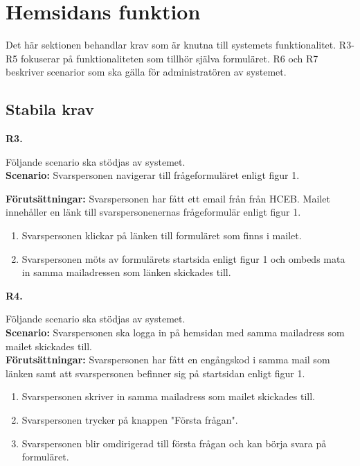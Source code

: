 \documentclass{article}
\begin{document}
    \section{Hemsidans funktion}
\normalsize{Det här sektionen behandlar krav som är knutna till systemets funktionalitet. R3-R5 fokuserar på funktionaliteten som tillhör själva formuläret. R6 och R7 beskriver scenarior som ska gälla för administratören av systemet.
}
    \subsection{Stabila krav}
    
    \large{\textbf{R3.}}
    \normalsize{Följande scenario ska stödjas av systemet. \\
    \textbf{Scenario:} Svarspersonen navigerar till frågeformuläret enligt figur 1.
        
    \noindent \textbf{Förutsättningar:} Svarspersonen har fått ett email från från HCEB. Mailet innehåller en länk till svarspersonenernas frågeformulär enligt figur 1.
        \begin{enumerate}
            \item Svarspersonen klickar på länken till formuläret som finns i mailet.
            \item Svarspersonen möts av formulärets startsida enligt figur 1 och ombeds mata in samma mailadressen som länken skickades till. 
        \end{enumerate}
}
\vspace{1em}

\noindent \large{\textbf{R4.}}
    \normalsize{Följande scenario ska stödjas av systemet. \\
    \textbf{Scenario:} Svarspersonen ska logga in på hemsidan med samma mailadress som mailet skickades till.
        \\
    \textbf{Förutsättningar:} Svarspersonen har fått en engångskod i samma mail som länken samt att svarspersonen befinner sig på startsidan enligt figur 1.
        \begin{enumerate}
           \item Svarspersonen skriver in samma mailadress som mailet skickades till.
           \item Svarspersonen trycker på knappen "Första frågan".
           \item  Svarspersonen blir omdirigerad till första frågan och kan börja svara på formuläret.
        \end{enumerate}
   }
   
\end{document}
